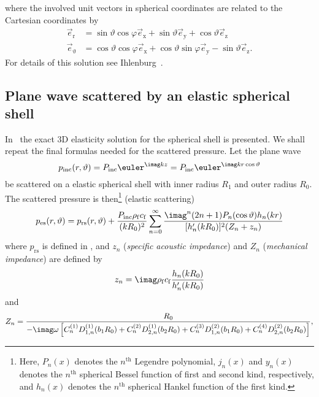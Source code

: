 where the involved unit vectors in spherical coordinates are related to the Cartesian coordinates by
\begin{align*}
	\vec{e}_{\mathrm{r}} &= \sin\vartheta\cos\varphi\vec{e}_{\mathrm{x}} + \sin\vartheta\vec{e}_{\mathrm{y}} + \cos\vartheta\vec{e}_{\mathrm{z}}\\
	\vec{e}_{\upvartheta} &= \cos\vartheta\cos\varphi\vec{e}_{\mathrm{x}} + \cos\vartheta\sin\varphi\vec{e}_{\mathrm{y}} - \sin\vartheta\vec{e}_{\mathrm{z}}.
\end{align*}
For details of this solution see Ihlenburg~\cite[p. 28]{Ihlenburg1998fea}.

\subsection{Plane wave scattered by an elastic spherical shell}
In~\cite[pp. 12-20]{Chang1994voa} the exact 3D elasticity solution for the spherical shell is presented. We shall repeat the final formulas needed for the scattered pressure.
Let the plane wave
\begin{equation*}
	p_{\textrm{inc}}(r,\vartheta) = P_{\mathrm{inc}}\euler^{\imag kz} = P_{\mathrm{inc}}\euler^{\imag kr\cos\vartheta}
\end{equation*}
be scattered on a elastic spherical shell with inner radius $R_1$ and outer radius $R_0$. The scattered pressure is then\footnote{Here, $P_n(x)$ denotes the $n^{\mathrm{th}}$ Legendre polynomial, $j_n(x)$ and $y_n(x)$ denotes the $n^{\mathrm{th}}$ spherical Bessel function of first and second kind, respectively, and $h_n(x)$ denotes the $n^{\mathrm{th}}$ spherical Hankel function of the first kind.}  (elastic scattering)
\begin{equation}\label{Eq2:exact3DscatteringSphericalShellSol}
	p_{\mathrm{es}}(r,\vartheta) = p_{\mathrm{rs}}(r,\vartheta) + \frac{P_{\mathrm{inc}}\rho_{\mathrm{f}} c_{\mathrm{f}}}{(kR_0)^2}\sum_{n=0}^\infty \frac{\imag^n(2n+1)P_n(\cos\vartheta)h_n(kr)}{[h_n'(kR_0)]^2(Z_n+z_n)}
\end{equation}
where $p_{\mathrm{rs}}$ is defined in , and $z_n$ (\textit{specific acoustic impedance}) and $Z_n$ (\textit{mechanical impedance}) are defined by
\begin{equation*}
	z_n = \imag\rho_{\mathrm{f}} c_{\mathrm{f}}\frac{h_n(kR_0)}{h_n'(kR_0)}
\end{equation*}
and
\begin{equation*}
	Z_n =\frac{R_0}{-\imag\omega\left[C_n^{(1)} D_{1,n}^{(1)}(b_1 R_0) + C_n^{(2)} D_{2,n}^{(1)}(b_2 R_0) + C_n^{(3)} D_{1,n}^{(2)}(b_1 R_0) + C_n^{(4)} D_{2,n}^{(2)}(b_2 R_0)\right]},
\end{equation*}
